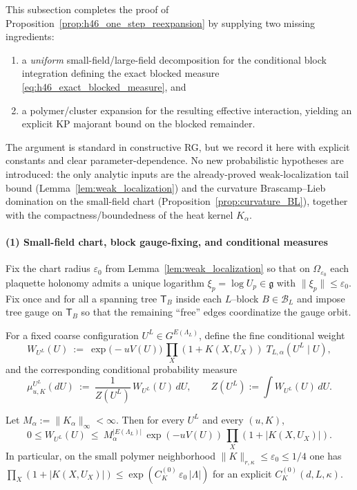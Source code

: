 This subsection completes the proof of Proposition~\ref{prop:h46_one_step_reexpansion} by supplying two missing ingredients:
\begin{enumerate}[leftmargin=*]
\item a \emph{uniform} small-field/large-field decomposition for the conditional block integration defining the exact blocked measure
\eqref{eq:h46_exact_blocked_measure}, and
\item a polymer/cluster expansion for the resulting effective interaction, yielding an explicit KP majorant bound on the blocked remainder.
\end{enumerate}
The argument is standard in constructive RG, but we record it here with explicit constants and clear parameter-dependence.
No new probabilistic hypotheses are introduced: the only analytic inputs are the already-proved weak-localization tail bound
(Lemma~\ref{lem:weak_localization}) and the curvature Brascamp--Lieb domination on the small-field chart
(Proposition~\ref{prop:curvature_BL}), together with the compactness/boundedness of the heat kernel $K_\alpha$.

\paragraph*{(1) Small-field chart, block gauge-fixing, and conditional measures}

Fix the chart radius $\varepsilon_0$ from Lemma~\ref{lem:weak_localization} so that on $\Omega_{\varepsilon_0}$ each plaquette holonomy admits a
unique logarithm $\xi_p=\log U_p\in\mathfrak g$ with $\|\xi_p\|\le \varepsilon_0$.
Fix once and for all a spanning tree $\mathsf T_B$ inside each $L$--block $B\in\mathcal B_L$ and impose tree gauge on $\mathsf T_B$ so that the
remaining ``free'' edges coordinatize the gauge orbit.

For a fixed coarse configuration $U^L\in G^{E(\Lambda_L)}$, define the fine conditional weight
\begin{equation}\label{eq:h47_conditional_weight}
W_{U^L}(U)\ :=\ \exp\bigl(-uV(U)\bigr)\,\prod_{X}(1+K(X,U_X))\;T_{L,\alpha}(U^L\mid U),
\end{equation}
and the corresponding conditional probability measure
\begin{equation}\label{eq:h47_conditional_measure}
\mu_{u,K}^{U^L}(dU)\ :=\ \frac{1}{Z(U^L)}\,W_{U^L}(U)\,dU,\qquad Z(U^L):=\int W_{U^L}(U)\,dU.
\end{equation}

\begin{lemma}\label{lem:h47_conditional_bounded}
Let $M_\alpha:=\|K_\alpha\|_{\infty}<\infty$.
Then for every $U^L$ and every $(u,K)$,
\[
0\le W_{U^L}(U)\ \le\ M_\alpha^{|E(\Lambda_L)|}\,\exp(-uV(U))\,\prod_X(1+|K(X,U_X)|).
\]
In particular, on the small polymer neighborhood $\|K\|_{r,\kappa}\le\varepsilon_0\le 1/4$ one has
$\prod_X(1+|K(X,U_X)|)\le \exp(C_K^{(0)}\,\varepsilon_0\,|\Lambda|)$ for an explicit $C_K^{(0)}(d,L,\kappa)$.
\end{lemma}

